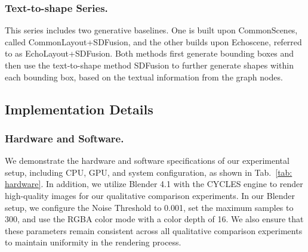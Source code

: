 \subsubsection{Text-to-shape Series.}
This series includes two generative baselines. One is built upon CommonScenes, called CommonLayout+SDFusion, and the other builds upon Echoscene, referred to as EchoLayout+SDFusion. Both methods first generate bounding boxes and then use the text-to-shape method SDFusion \cite{cheng2023sdfusion} to further generate shapes within each bounding box, based on the textual information from the graph nodes.

\subsection{Implementation Details}

\subsubsection{Hardware and Software.}
We demonstrate the hardware and software specifications of our experimental setup, including CPU, GPU, and system configuration, as shown in Tab.~\ref{tab: hardware}. 
In addition, we utilize Blender 4.1 with the CYCLES engine to render high-quality images for our qualitative comparison experiments. In our Blender setup, we configure the Noise Threshold to 0.001, set the maximum samples to 300, and use the RGBA color mode with a color depth of 16. 
We also ensure that these parameters remain consistent across all qualitative comparison experiments to maintain uniformity in the rendering process.

